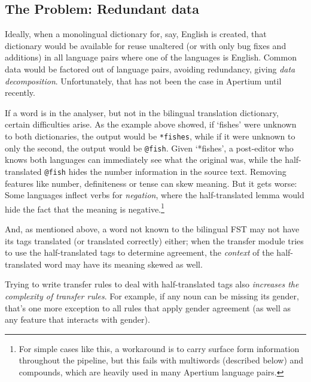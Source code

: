 \documentclass[10pt, a4paper]{article}
\newcommand{\ana}[1]{\texttt{#1}}
\newcommand{\f}[1]{`#1'}
\begin{document}
\subsection{The Problem: Redundant data}
\label{sec:problem}

Ideally, when a monolingual dictionary for, say, English is created,
that dictionary would be available for reuse unaltered (or with only
bug fixes and additions) in all language pairs where one of the
languages is English. Common data would be factored out of language
pairs, avoiding redundancy, giving \emph{data decomposition}.
Unfortunately, that has not been the case in Apertium until recently.

If a word is in the analyser, but not in the bilingual translation
dictionary, certain difficulties arise. As the example above showed,
if \f{fishes} were unknown to both dictionaries, the output would be
\ana{*fishes}, while if it were unknown to only the second, the output
would be \ana{@fish}. Given \f{*fishes}, a post-editor who knows both
languages can immediately see what the original was, while the
half-translated \ana{@fish} hides the number information in the source
text. Removing features like number, definiteness or tense can skew
meaning.  But it gets worse: Some languages inflect verbs for
\emph{negation}, where the half-translated lemma would hide the fact
that the meaning is negative.\footnote{For simple cases like this, a
    workaround is to carry surface form information throughout the
    pipeline, but this fails with multiwords (described below) and
    compounds, which are heavily used in many Apertium language
    pairs.}

And, as mentioned above, a word not known to the bilingual FST may not
have its tags translated (or translated correctly) either; when the
transfer module tries to use the half-translated tags to determine
agreement, the \emph{context} of the half-translated word may have its
meaning skewed as well.

Trying to write transfer rules to deal with half-translated tags also
\emph{increases the complexity of transfer rules}. For example, if any
noun can be missing its gender, that's one more exception to all rules
that apply gender agreement (as well as any feature that interacts with
gender).
\end{document}

